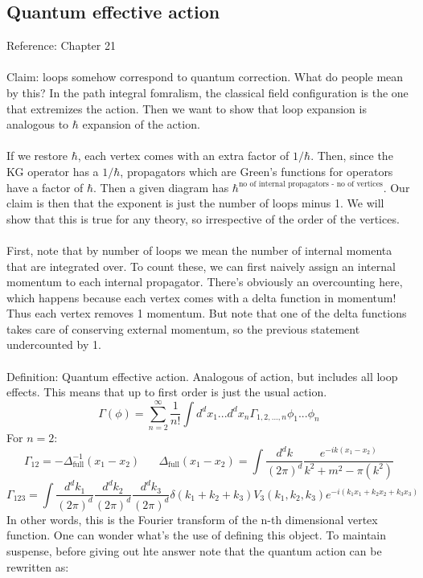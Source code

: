 \documentclass[12 pt]{article}
\begin{document}
\subsection*{Quantum effective action}
Reference: Chapter 21
\\
\\
Claim: loops somehow correspond to quantum correction. What do people mean by this? In the path integral fomralism, the classical field configuration is the one that extremizes the action. Then we want to show that loop expansion is analogous to $\hbar$ expansion of the action.
\\
\\
If we restore $\hbar$, each vertex comes with an extra factor of $1/\hbar$. Then, since the KG operator has a $1/\hbar$, propagators which are Green's functions for operators have a factor of $\hbar$. Then a given diagram has $\hbar^{\text{no of internal propagators - no of vertices}}$. Our claim is then that the exponent is just the number of loops minus 1. We will show that this is true for any theory, so irrespective of the order of the vertices.
\\
\\
First, note that by number of loops we mean the number of internal momenta that are integrated over. To count these, we can first naively assign an internal momentum to each internal propagator. There's obviously an overcounting here, which happens because each vertex comes with a delta function in momentum! Thus each vertex removes 1 momentum. But note that one of the delta functions takes care of conserving external momentum, so the previous statement undercounted by 1.
\\
\\
Definition: Quantum effective action. Analogous of action, but includes all loop effects. This means that up to first order is just the usual action.
\[         \Gamma(\phi)  = \sum_{n=2}^{\infty} \frac{1}{n!} \int d^d x_1 ... d^d x_n  \Gamma_{1,2,...,n} \phi_1 ... \phi_n    \]
For $n=2$:
\[     \Gamma_{12} = -  \Delta^{-1}_{\text{full}} (x_1 - x_2) \;\;\;\;\;\;   \Delta_{\text{full}} (x_1 - x_2)  = \int \frac{d^d k}{(2\pi)^d} \frac{e^{-ik(x_1-x_2)}}{k^2+m^2 - \pi(k^2)}\]
\[     \Gamma_{123} = \int \frac{d^d k_1}{(2\pi)^d}\frac{d^d k_2}{(2\pi)^d}\frac{d^d k_3}{(2\pi)^d}  \delta(k_1+k_2+k_3)  V_3 (k_1, k_2, k_3)  e^{-i(k_1x_1 + k_2x_2 + k_3x_3)}  \]
In other words, this is the Fourier transform of the n-th dimensional vertex function. One can wonder what's the use of defining this object. To maintain suspense, before giving out hte answer note that the quantum action can be rewritten as:
\end{document}
